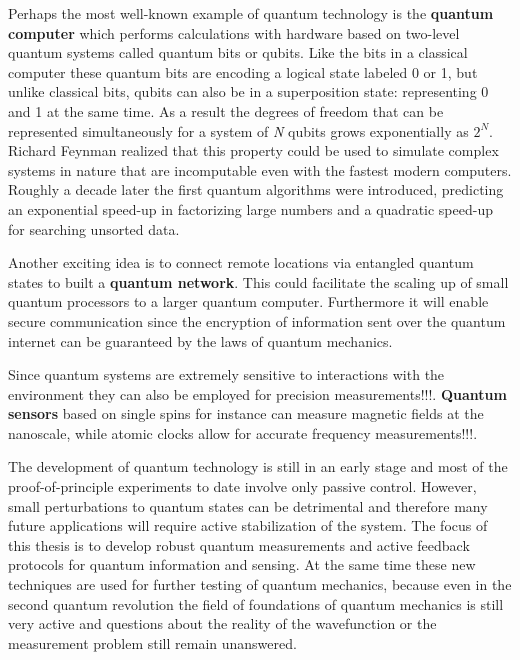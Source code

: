 Perhaps the most well-known example of quantum technology is the \textbf{quantum computer}\cite{Nielsen__2000,Mermin__2007} which performs calculations with hardware based on two-level quantum systems called quantum bits or qubits. Like the bits in a classical computer these quantum bits are encoding a logical state labeled 0 or 1, but unlike classical bits, qubits can also be in a superposition state: representing 0 and 1 at the same time. As a result the degrees of freedom that can be represented simultaneously for a system of \textit{N} qubits grows exponentially as $2^N$. Richard Feynman realized that this property could be used to simulate complex systems in nature\cite{Feynman_IntJTheorPhys_1982} that are incomputable even with the fastest modern computers. Roughly a decade later the first quantum algorithms were introduced, predicting an exponential speed-up in factorizing large numbers\cite{Shor_SIAMJ.Comput._1997} and a quadratic speed-up for searching unsorted data\cite{Grover_Phys.Rev.Lett._1997}.

Another exciting idea is to connect remote locations via entangled quantum states to built a \textbf{quantum network}\cite{Kimble_Nature_2008}. This could facilitate the scaling up of small quantum processors to a larger quantum computer. Furthermore it will enable secure communication since the encryption of information sent over the quantum internet can be guaranteed by the laws of quantum mechanics\cite{Gisin_NatPhoton_2007}.

Since quantum systems are extremely sensitive to interactions with the environment they can also be employed for precision measurements!!!. \textbf{Quantum sensors} based on single spins for instance can measure magnetic fields at the nanoscale\cite{Taylor_NatPhys_2008}, while atomic clocks allow for accurate frequency measurements!!!.

The development of quantum technology is still in an early stage and most of the proof-of-principle experiments to date involve only passive control. However, small perturbations to quantum states can be detrimental and therefore many future applications will require active stabilization of the system. The focus of this thesis is to develop robust quantum measurements and active feedback protocols for quantum information and sensing\cite{Wiseman__2010}. At the same time these new techniques are used for further testing of quantum mechanics, because even in the second quantum revolution the field of foundations of quantum mechanics is still very active and questions about the reality of the wavefunction or the measurement problem still remain unanswered. 

